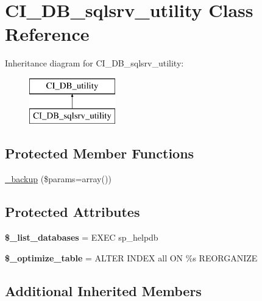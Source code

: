 \hypertarget{class_c_i___d_b__sqlsrv__utility}{}\section{C\+I\+\_\+\+D\+B\+\_\+sqlsrv\+\_\+utility Class Reference}
\label{class_c_i___d_b__sqlsrv__utility}
Inheritance diagram for C\+I\+\_\+\+D\+B\+\_\+sqlsrv\+\_\+utility\+:\begin{figure}[H]
\begin{center}
\leavevmode
\includegraphics[height=2.000000cm]{class_c_i___d_b__sqlsrv__utility}
\end{center}
\end{figure}
\subsection*{Protected Member Functions}
\begin{DoxyCompactItemize}
\item 
\mbox{\hyperlink{class_c_i___d_b__sqlsrv__utility_afe39f6e41622981454ddc5f10d8fe24e}{\+\_\+backup}} (\$params=array())
\end{DoxyCompactItemize}
\subsection*{Protected Attributes}
\begin{DoxyCompactItemize}
\item 
\mbox{\label{class_c_i___d_b__sqlsrv__utility_a037b3da16d1751aa38a07c7c86e6011e}} 
{\bfseries \$\+\_\+list\+\_\+databases} = \textquotesingle{}E\+X\+EC sp\+\_\+helpdb\textquotesingle{}
\item 
\mbox{\label{class_c_i___d_b__sqlsrv__utility_a2278605625de8f51d7af46446fd3a211}} 
{\bfseries \$\+\_\+optimize\+\_\+table} = \textquotesingle{}A\+L\+T\+ER I\+N\+D\+EX all ON \%s R\+E\+O\+R\+G\+A\+N\+I\+ZE\textquotesingle{}
\end{DoxyCompactItemize}
\subsection*{Additional Inherited Members}


